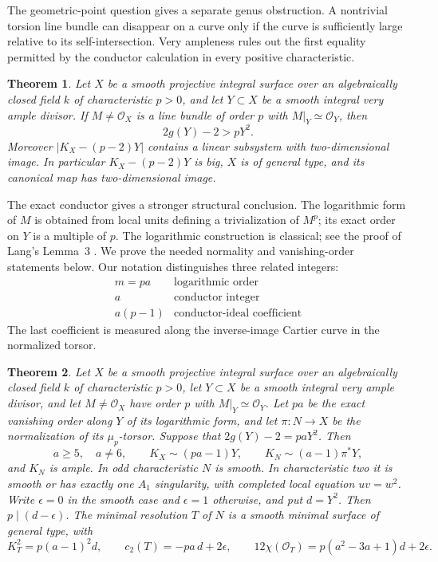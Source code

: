 \documentclass[11pt]{article}
\newtheorem{theorem}{Theorem}[section]
\theoremstyle{remark}\newtheorem{remark}[theorem]{Remark}
\newcommand{\OO}{\mathcal O}
\begin{document}
The geometric-point question gives a separate genus obstruction. A nontrivial torsion line bundle can disappear on a curve only if the curve is sufficiently large relative to its self-intersection. Very ampleness rules out the first equality permitted by the conductor calculation in every positive characteristic.

\begin{theorem}\label{thm:strict-picard-all}
Let $X$ be a smooth projective integral surface over an algebraically
closed field $k$ of characteristic $p>0$, and let $Y\subset X$ be a
smooth integral very ample divisor. If $M\ne\OO_X$ is a line bundle
of order $p$ with $M|_Y\simeq\OO_Y$, then
\[
 2g(Y)-2>pY^2.
\]
Moreover $|K_X-(p-2)Y|$ contains a linear subsystem with
two-dimensional image. In particular $K_X-(p-2)Y$ is big,
$X$ is of general type, and its canonical map has two-dimensional image.
\end{theorem}

The exact conductor gives a stronger structural conclusion.
The logarithmic form of $M$ is obtained from local units defining a
trivialization of $M^p$; its exact order on $Y$ is a multiple of $p$.
The logarithmic construction is classical; see the proof of
Lang's Lemma~3 \cite[pp.~198--199]{LangPTorsion}.
We prove the needed normality and vanishing-order statements below.
Our notation distinguishes three related integers:
\[
 \begin{array}{c|l}
 m=pa&\text{logarithmic order}\\
 a&\text{conductor integer}\\
 a(p-1)&\text{conductor-ideal coefficient}
 \end{array}
\]
The last coefficient is measured along the inverse-image Cartier curve
in the normalized torsor.

\begin{theorem}\label{thm:conductor-equality-structure}
Let $X$ be a smooth projective integral surface over an algebraically
closed field $k$ of characteristic $p>0$, let $Y\subset X$ be a
smooth integral very ample divisor, and let $M\ne\OO_X$ have
order $p$ with $M|_Y\simeq\OO_Y$.
Let $pa$ be the exact vanishing order along $Y$ of its logarithmic
form, and let $\pi:N\to X$ be the normalization of its
$\mu_p$-torsor. Suppose that $2g(Y)-2=paY^2$.
Then
\[
 a\geq5,\quad a\ne6,\qquad K_X\sim(pa-1)Y,\qquad
 K_N\sim(a-1)\pi^*Y,
\]
and $K_N$ is ample. In odd characteristic $N$ is smooth.
In characteristic two it is smooth or has exactly one $A_1$
singularity, with completed local equation $uv=w^2$.
Write $\epsilon=0$ in the smooth case and $\epsilon=1$ otherwise,
and put $d=Y^2$. Then $p\mid(d-\epsilon)$.
The minimal resolution $T$ of $N$ is a smooth minimal surface of
general type, with
\[
 K_T^2=p(a-1)^2d,\qquad c_2(T)=-pa\,d+2\epsilon,
 \qquad 12\chi(\OO_T)=p(a^2-3a+1)d+2\epsilon.
\]
\end{theorem}
\end{document}
